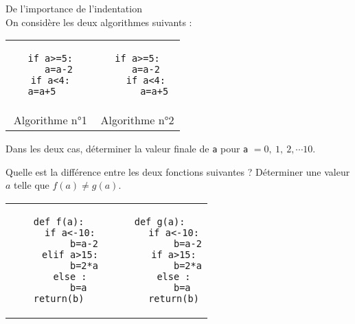 \begin{exercice}De l'importance de l'indentation\\
On considère les deux algorithmes suivants :
\begin{center}
\begin{tabular}{cc}
\begin{minipage}{7cm}
\begin{verbatim}
if a>=5:
   a=a-2
if a<4:
   a=a+5      
\end{verbatim}
\end{minipage} &
\begin{minipage}{7cm}
\begin{verbatim}
if a>=5:
   a=a-2
   if a<4:
      a=a+5
\end{verbatim}        
\end{minipage}\\
Algorithme n°1&Algorithme n°2
\end{tabular}
\end{center}
Dans les deux cas, déterminer la valeur finale de \verb?a? pour \verb?a? $= 0,\ 1,\ 2,\cdots 10$. 
\end{exercice}
\bigskip


\begin{exercice}
Quelle est la différence entre les deux fonctions suivantes ? Déterminer une valeur $a$ telle que $f(a)\neq g(a)$.
\begin{center}
\begin{tabular}{cc}
\begin{minipage}{7cm}
\begin{verbatim}
def f(a):
    if a<-10:
         b=a-2
    elif a>15:
         b=2*a
    else :
         b=a  
    return(b)    
\end{verbatim}
\end{minipage} &
\begin{minipage}{7cm}
\begin{verbatim}
def g(a):
     if a<-10:
          b=a-2
     if a>15:
          b=2*a
     else :
          b=a  
     return(b)
\end{verbatim}        
\end{minipage}
\end{tabular}
\end{center}
\end{exercice}
\bigskip



